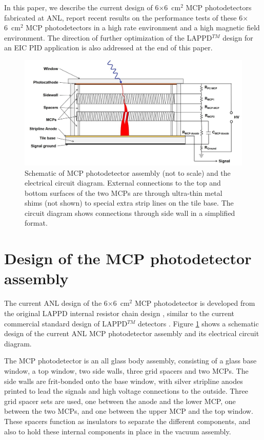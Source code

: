 \documentclass[preprint,5p]{elsarticle}
\begin{document}
In this paper, we describe the current design of 6$\times$6~cm$^2$ MCP 
photodetectors fabricated at ANL, report recent results on the performance 
tests of these 6$\times$6~cm$^2$ MCP photodetectors in a high rate environment 
and a high magnetic field environment. The direction of further optimization of 
the LAPPD$^{TM}$ design for an EIC PID application is also addressed at the end 
of this paper.

\begin{figure}[tbp]
\centering \includegraphics[scale=0.3]{fig/MCPs_design.png}
\caption{Schematic of MCP photodetector assembly (not to scale) and the 
   electrical circuit diagram. External connections to the top and bottom 
surfaces of the two MCPs are through ultra-thin metal shims (not shown) to 
special extra strip lines on the tile base. The circuit diagram shows 
connections through side wall in a simplified format.} 
\label{fig:design}
\end{figure}

\section{Design of the MCP photodetector assembly} \label{sec_design}
The current ANL design of the 6$\times$6~cm$^2$ MCP photodetector is developed 
from the original LAPPD internal resistor chain design \cite{Wang-MCPs2}, 
similar to the current commercial standard design of LAPPD$^{TM}$ detectors 
\cite{Craven-MCPs}. Figure \ref{fig:design} shows a schematic design of the 
current ANL MCP photodetector assembly and its electrical circuit diagram.  

The MCP photodetector is an all glass body assembly, consisting of a glass base 
window, a top window, two side walls, three grid spacers and two MCPs. The side 
walls are frit-bonded onto the base window, with silver stripline anodes 
printed to lead the signals and high voltage connections to the outside. Three 
grid spacer sets are used, one between the anode and the lower MCP, one between 
the two MCPs, and one between the upper MCP and the top window. These spacers 
function as insulators to separate the different components, and also to hold 
these internal components in place in the vacuum assembly. 
\end{document}
